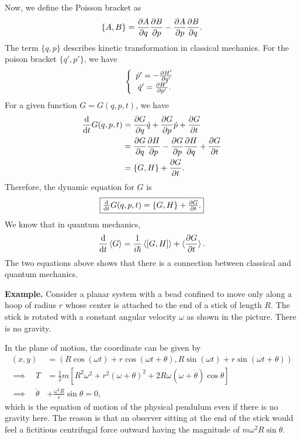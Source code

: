 Now, we define the Poisson bracket as
\begin{align}
\{ A,B\}= \frac{\partial {A}}{\partial {q}}\frac{\partial {B}}{\partial {p}}-\frac{\partial {A}}{\partial {p}}\frac{\partial {B}}{\partial {q}}.
\end{align}
The term $ \{q,p \} $ describes kinetic transformation in classical mechanics. For the poison bracket $ \{q',p' \} $, we have
\begin{equation}
\left\{ 
\begin{array}{c}
\dot{p}'= -\frac{\partial {H'}}{\partial {q'}}\\
\dot{q}'= \frac{\partial {H'}}{\partial {p'}}.
\end{array}\right.
\end{equation}
For a given function $ G=G(q,p,t) $, we have
\begin{align}
\frac{{\mathrm d} {}}{{\mathrm d}t} G(q,p,t)&= \frac{\partial {G}}{\partial {q}}\dot{q} + \frac{\partial {G}}{\partial {p}} \dot{p}+ \frac{\partial {G}}{\partial t}\\
&= \frac{\partial {G}}{\partial {q}}\frac{\partial {H}}{\partial {p}}-\frac{\partial {G}}{\partial {p}}\frac{\partial {H}}{\partial {q}}+\frac{\partial {G}}{\partial t} \\
&=\{G,H \}+ \frac{\partial {G}}{\partial t}.
\end{align}
Therefore, the dynamic equation for $ G $ is 
\begin{equation}
\fbox{$\frac{{\mathrm d} {}}{{\mathrm d}t} G(q,p,t)=\{G,H \}+ \frac{\partial {G}}{\partial t}$.}
\end{equation}
We know that in quantum mechanics, 
\begin{align}
\frac{{\mathrm d} {}}{{\mathrm d}t} \mathinner{\langle{G}\rangle}=\frac{1}{i\hbar}\mathinner{\langle{[G,H]}\rangle}+ \mathinner{\langle{\frac{\partial {G}}{\partial t}}\rangle}.
\end{align}
The two equations above shows that there is a connection between classical and quantum mechanics. 


\textbf{Example. }Consider a planar system with a bead confined to
move only along a hoop of radius $r$ whose center is attached to
the end of a stick of length $R$. The stick is rotated with a constant
angular velocity $\omega$ as shown in the picture. There is no gravity.


In the plane of motion, the coordinate can be given by
\begin{align}
(x,y) & =\left(R\cos(\omega t)+r\cos\left(\omega t+\theta\right),R\sin(\omega t)+r\sin\left(\omega t+\theta\right)\right)\\
\implies\quad  T & =\frac{1}{2}m\left[R^{2}\omega^{2}+r^{2}\left(\omega+\theta\right)^{2}+2R\omega\left(\omega+\dot{\theta}\right)\cos\theta\right]\\
\implies \quad \ddot{\theta}&+\frac{\omega^{2}R}{r}\sin\theta  =0,
\end{align}
which is the equation of motion of the physical pendulum even if there
is no gravity here. The reason is that an observer sitting at the
end of the stick would feel a fictitious centrifugal force outward
having the magnitude of $m\omega^{2}R\sin\theta$.


